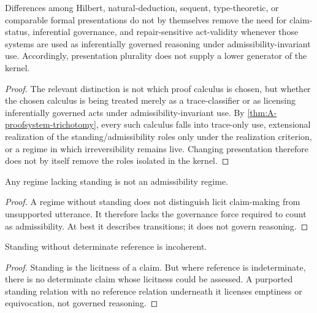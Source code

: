\begin{theorem}
\label{thm:A-calculus-plurality}
Differences among Hilbert, natural-deduction, sequent, type-theoretic, or comparable formal
presentations do not by themselves remove the need for claim-status, inferential governance, and
repair-sensitive act-validity whenever those systems are used as inferentially governed reasoning under admissibility-invariant use.
Accordingly, presentation plurality does not supply a lower generator of the kernel.
\end{theorem}

\begin{proof}
The relevant distinction is not which proof calculus is chosen, but whether the chosen calculus is
being treated merely as a trace-classifier or as licensing inferentially governed acts under admissibility-invariant use. By
\cref{thm:A-proofsystem-trichotomy}, every such calculus falls into trace-only use, extensional
realization of the standing/admissibility roles only under the realization criterion, or a regime in which irreversibility remains live.
Changing presentation therefore does not by itself remove the roles isolated in the kernel.
\end{proof}

\begin{proposition}
\label{prop:A-adm-requires-stand}
Any regime lacking standing is not an admissibility regime.
\end{proposition}

\begin{proof}
A regime without standing does not distinguish licit claim-making from unsupported utterance. It therefore lacks the governance force required to count as admissibility. At best it describes transitions; it does not govern reasoning.
\end{proof}

\begin{proposition}
\label{prop:A-stand-requires-ref}
Standing without determinate reference is incoherent.
\end{proposition}

\begin{proof}
Standing is the licitness of a claim. But where reference is indeterminate, there is no determinate claim whose licitness could be assessed. A purported standing relation with no reference relation underneath it licenses emptiness or equivocation, not governed reasoning.
\end{proof}


